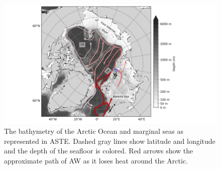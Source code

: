 \documentclass[draft]{agujournal2019}
\begin{document}
\begin{figure} %

    \includegraphics[width=\linewidth]{figs/Arctic_bathymetry.png}
    \caption{The bathymetry of the Arctic Ocean and marginal seas as represented in ASTE. Dashed gray lines show latitude and longitude and the depth of the seafloor is colored. Red arrows show the approximate path of AW as it loses heat around the Arctic.}
    \label{fig:wholeArctic}
    \vspace{-50pt}
\end{figure}
\end{document}
